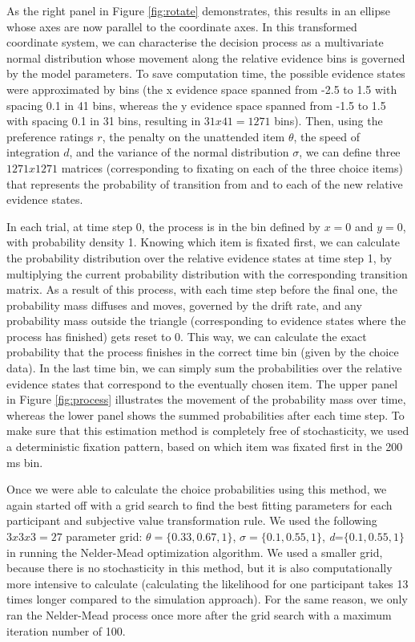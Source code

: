\documentclass[11pt,a4paper]{article}
\begin{document}
As the right panel in Figure \ref{fig:rotate} demonstrates, this results in an ellipse whose axes are now parallel to the coordinate axes. In this transformed coordinate system, we can characterise the decision process as a multivariate normal distribution whose movement along the relative evidence bins is governed by the model parameters. To save computation time, the possible evidence states were approximated by bins (the x evidence space spanned from -2.5 to 1.5 with spacing 0.1 in 41 bins, whereas the y evidence space spanned from -1.5 to 1.5 with spacing 0.1 in 31 bins, resulting in $31x41 = 1271$ bins). Then, using the preference ratings $r$, the penalty on the unattended item $\theta$, the speed of integration $d$, and the variance of the normal distribution $\sigma$, we can define three $1271x1271$ matrices (corresponding to fixating on each of the three choice items) that represents the probability of transition from and to each of the new relative evidence states. 

In each trial, at time step 0, the process is in the bin defined by $x = 0$ and $y = 0$, with probability density 1. Knowing which item is fixated first, we can calculate the probability distribution over the relative evidence states at time step 1, by multiplying the current probability distribution with the corresponding transition matrix. As a result of this process, with each time step before the final one, the probability mass diffuses and moves, governed by the drift rate, and any probability mass outside the triangle (corresponding to evidence states where the process has finished) gets reset to 0. This way, we can calculate the exact probability that the process finishes in the correct time bin (given by the choice data). In the last time bin, we can simply sum the probabilities over the relative evidence states that correspond to the eventually chosen item. The upper panel in Figure \ref{fig:process} illustrates the movement of the probability mass over time, whereas the lower panel shows the summed probabilities after each time step. To make sure that this estimation method is completely free of stochasticity, we used a deterministic fixation pattern, based on which item was fixated first in the 200 ms bin. 

Once we were able to calculate the choice probabilities using this method, we again started off with a grid search to find the best fitting parameters for each participant and subjective value transformation rule. We used the following $3x3x3=27$ parameter grid: $\theta=\{0.33, 0.67, 1\}$, $\sigma=\{0.1, 0.55, 1\}$, \textit{d}=$\{0.1, 0.55, 1\}$ in running the Nelder-Mead optimization algorithm. We used a smaller grid, because there is no stochasticity in this method, but it is also computationally more intensive to calculate (calculating the likelihood for one participant takes 13 times longer compared to the simulation approach). For the same reason, we only ran the Nelder-Mead process once more after the grid search with a maximum iteration number of 100.  
\end{document}
